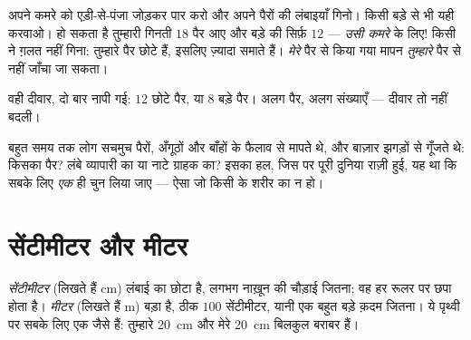 \begin{example}\label{ex:g2:measuring-length:pace}
अपने कमरे को एड़ी-से-पंजा जोड़कर पार करो और अपने पैरों की लंबाइयाँ
गिनो। किसी बड़े से भी यही करवाओ। हो सकता है तुम्हारी गिनती $18$ पैर
आए और बड़े की सिर्फ़ $12$ --- \emph{उसी कमरे} के लिए! किसी ने ग़लत
नहीं गिना: तुम्हारे पैर छोटे हैं, इसलिए ज़्यादा समाते हैं।
\emph{मेरे} पैर से किया गया मापन \emph{तुम्हारे} पैर से नहीं जाँचा जा
सकता।
\end{example}

\begin{omfigure}

{\small वही दीवार, दो बार नापी गई: $12$ छोटे पैर, या $8$ बड़े पैर।
अलग पैर, अलग संख्याएँ --- दीवार तो नहीं बदली।}
\end{omfigure}

\begin{remark}[बाज़ार का झगड़ा]\label{rem:g2:measuring-length:argument}
बहुत समय तक लोग सचमुच पैरों, अँगूठों और बाँहों के फैलाव से मापते थे,
और बाज़ार झगड़ों से गूँजते थे: किसका पैर? लंबे व्यापारी का या नाटे
ग्राहक का? इसका हल, जिस पर पूरी दुनिया राज़ी हुई, यह था कि सबके लिए
\emph{एक} ही  चुन लिया जाए --- ऐसा  जो किसी के शरीर का न
हो।
\end{remark}

\section{सेंटीमीटर और मीटर}

\begin{definition}[सेंटीमीटर और मीटर]\label{def:g2:measuring-length:units}
\emph{सेंटीमीटर} (लिखते हैं \unit{cm}) लंबाई का
छोटा  है, लगभग नाख़ून की चौड़ाई जितना; वह हर रूलर पर छपा होता
है। \emph{मीटर} (लिखते हैं \unit{m}) बड़ा  है, ठीक
$100$ सेंटीमीटर, यानी एक बहुत बड़े क़दम जितना। ये  पृथ्वी पर
सबके लिए एक जैसे हैं: तुम्हारे \qty{20}{cm} और मेरे \qty{20}{cm}
बिलकुल बराबर हैं।
\end{definition}

